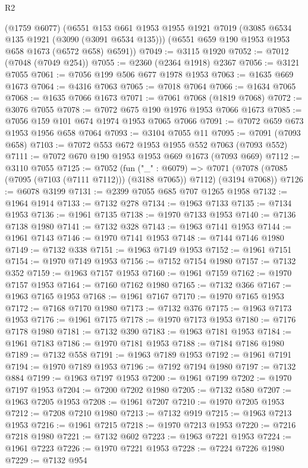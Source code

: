 \begin{lexlean}{R2}
\begin{coremodule}
    (@1759 @6077)
    (@6551
      @153
      @661
      @1953
      @1955
      @1921
      @7019
      (@3085 @6534 @135 @1921 (@3090 (@3091 @6534 @135)))
      (@6551 @659 @190 @1953 @1953 @658 @1673 (@6572 @658) @6591))
@7049 := @3115 @1920
@7052 := @7012 (@7048 (@7049 @254))
@7055 := @2360 (@2364 @1918) @2367
@7056 := @3121 @7055
@7061 := @7056 @199 @506 @677 @1978 @1953
@7063 := @1635 @669 @1673
@7064 := @4316 @7063
@7065 := @7018 @7064
@7066 := @1634 @7065
@7068 := @1635 @7066 @1673
@7071 := @7061 @7068 (@1819 @7068)
@7072 := @3076 @7055
@7078 := @7072 @675 @190 @1976 @1953 @7066 @1673
@7085 := @7056 @159 @101 @674 @1974 @1953 @7065 @7066
@7091 := @7072 @659 @673 @1953 @1956 @658 @7064
@7093 := @3104 @7055 @11
@7095 := @7091 (@7093 @658)
@7103 := @7072 @553 @672 @1953 @1955 @552 @7063 (@7093 @552)
@7111 := @7072 @670 @190 @1953 @1953 @669 @1673 (@7093 @669)
@7112 := @3110 @7055
@7125 := @7052
    (fun ("_" : @6079) =>
    @7071 (@7078 (@7085 (@7095 (@7103 (@7111 @7112))) (@3188 @7065)) @7112) (@3194 @7068))
@7126 := @6078 @3199
@7131 := @2399 @7055 @685 @707 @1265 @1958
@7132 := @1964 @1914
@7133 := @7132 @278
@7134 := @1963 @7133
@7135 := @7134 @1953
@7136 := @1961 @7135
@7138 := @1970 @7133 @1953
@7140 := @7136 @7138 @1980
@7141 := @7132 @328
@7143 := @1963 @7141 @1953
@7144 := @1961 @7143
@7146 := @1970 @7141 @1953
@7148 := @7144 @7146 @1980
@7149 := @7132 @338
@7151 := @1963 @7149 @1953
@7152 := @1961 @7151
@7154 := @1970 @7149 @1953
@7156 := @7152 @7154 @1980
@7157 := @7132 @352
@7159 := @1963 @7157 @1953
@7160 := @1961 @7159
@7162 := @1970 @7157 @1953
@7164 := @7160 @7162 @1980
@7165 := @7132 @366
@7167 := @1963 @7165 @1953
@7168 := @1961 @7167
@7170 := @1970 @7165 @1953
@7172 := @7168 @7170 @1980
@7173 := @7132 @376
@7175 := @1963 @7173 @1953
@7176 := @1961 @7175
@7178 := @1970 @7173 @1953
@7180 := @7176 @7178 @1980
@7181 := @7132 @390
@7183 := @1963 @7181 @1953
@7184 := @1961 @7183
@7186 := @1970 @7181 @1953
@7188 := @7184 @7186 @1980
@7189 := @7132 @558
@7191 := @1963 @7189 @1953
@7192 := @1961 @7191
@7194 := @1970 @7189 @1953
@7196 := @7192 @7194 @1980
@7197 := @7132 @884
@7199 := @1963 @7197 @1953
@7200 := @1961 @7199
@7202 := @1970 @7197 @1953
@7204 := @7200 @7202 @1980
@7205 := @7132 @580
@7207 := @1963 @7205 @1953
@7208 := @1961 @7207
@7210 := @1970 @7205 @1953
@7212 := @7208 @7210 @1980
@7213 := @7132 @919
@7215 := @1963 @7213 @1953
@7216 := @1961 @7215
@7218 := @1970 @7213 @1953
@7220 := @7216 @7218 @1980
@7221 := @7132 @602
@7223 := @1963 @7221 @1953
@7224 := @1961 @7223
@7226 := @1970 @7221 @1953
@7228 := @7224 @7226 @1980
@7229 := @7132 @954

\end{coremodule}
\end{lexlean}
